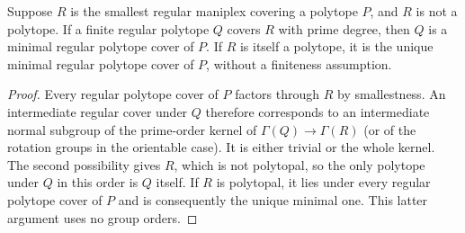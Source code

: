\begin{lemma}\label{lem:primeminimal}
Suppose $R$ is the smallest regular maniplex covering a polytope $P$, and $R$ is not a polytope. If a finite regular polytope $Q$ covers $R$ with prime degree, then $Q$ is a minimal regular polytope cover of $P$. If $R$ is itself a polytope, it is the unique minimal regular polytope cover of $P$, without a finiteness assumption.
\end{lemma}
\begin{proof}
Every regular polytope cover of $P$ factors through $R$ by smallestness. An intermediate regular cover under $Q$ therefore corresponds to an intermediate normal subgroup of the prime-order kernel of $\Gamma(Q)\to\Gamma(R)$ (or of the rotation groups in the orientable case). It is either trivial or the whole kernel. The second possibility gives $R$, which is not polytopal, so the only polytope under $Q$ in this order is $Q$ itself. If $R$ is polytopal, it lies under every regular polytope cover of $P$ and is consequently the unique minimal one. This latter argument uses no group orders.
\end{proof}
